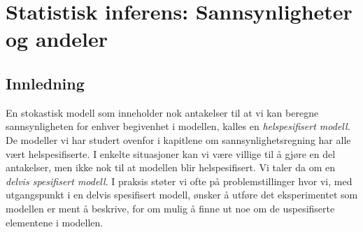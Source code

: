 \chapter{Statistisk inferens:  Sannsynligheter og andeler}
\label{kap:sannsynligheter_og_andeler} %

\section{Innledning}
En stokastisk modell som inneholder nok antakelser til at vi kan
beregne sannsynligheten for enhver begivenhet i modellen, kalles
en {\em helspesifisert modell.} De modeller vi har studert
ovenfor i kapitlene om sannsynlighets\-regning har alle vært
helspesifiserte. I enkelte situasjoner kan vi være villige til å
gjøre en del antakelser, men ikke nok til at modellen blir
helspesifisert. Vi taler da om en {\em delvis spesifisert
modell}. I praksis støter vi ofte på problemstillinger hvor vi,
med utgangspunkt i en delvis spesifisert modell, ønsker å utføre
det eksperimentet som modellen er ment å beskrive, for om mulig å
finne ut noe om de uspesifiserte elementene i modellen. \\

